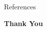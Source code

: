 \documentclass[10pt,aspectratio=43,mathserif]{beamer}
\numberwithin{equation}{section}
\begin{document}
\begin{frame}
References
\printbibliography

\end{frame}

\begin{frame}
\centering
{\Large \textbf{Thank You}}
\end{frame}

%
%
\end{document}
